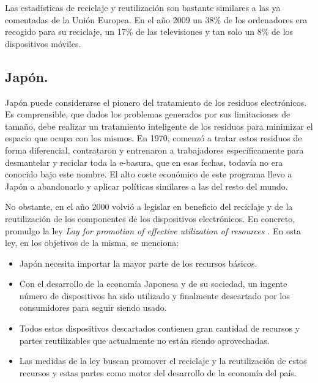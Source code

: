 Las estadísticas de reciclaje y reutilización \cite{epa-statistics} son bastante similares a las ya comentadas de la Unión Europea. En el año 2009 un 38\% de los ordenadores era recogido para su reciclaje, un 17\% de las televisiones y tan solo un 8\% de los dispositivos móviles.

\subsection{Japón.}

Japón puede considerarse el pionero del tratamiento de los residuos electrónicos. Es comprensible, que dados los problemas generados por sus limitaciones de tamaño, debe realizar un tratamiento inteligente de los residuos para minimizar el espacio que ocupa con los mismos. En 1970, comenzó a tratar estos residuos de forma diferencial, contrataron y entrenaron a trabajadores específicamente para desmantelar y reciclar toda la e-basura, que en esas fechas, todavía no era conocido bajo este nombre. El alto coste económico de este programa llevo a Japón a abandonarlo y aplicar políticas similares a las del resto del mundo.

No obstante, en el año 2000 volvió a legislar en beneficio del reciclaje y de la reutilización de los componentes de los dispositivos electrónicos. En concreto, promulgo la ley \emph{Lay for promotion of effective utilization of resources \cite{LPEUR}} . En esta ley, en los objetivos de la misma, se menciona:

\begin{itemize}

\item{Japón necesita importar la mayor parte de los recursos básicos.}

\item{Con el desarrollo de la economía Japonesa y de su sociedad, un ingente número de dispositivos ha sido utilizado y finalmente descartado por los consumidores para seguir siendo usado.}

\item{Todos estos dispositivos descartados contienen gran cantidad de recursos y partes reutilizables que actualmente no están siendo aprovechadas.}

\item{Las medidas de la ley buscan promover el reciclaje y la reutilización de estos recursos y estas partes como motor del desarrollo de la economía del país}.

\end{itemize}

